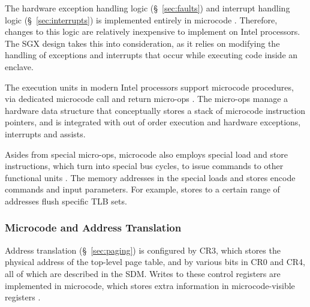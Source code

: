 The hardware exception handling logic (\S~\ref{sec:faults}) and interrupt
handling logic (\S~\ref{sec:interrupts}) is implemented entirely in microcode
\cite{intel1999exceptions}. Therefore, changes to this logic are relatively
inexpensive to implement on Intel processors. The SGX design takes this into
consideration, as it relies on modifying the handling of exceptions and
interrupts that occur while executing code inside an enclave.


The execution units in modern Intel processors support microcode procedures,
via dedicated microcode call and return micro-ops \cite{intel2007microstack}.
The micro-ops manage a hardware data structure that conceptually stores a stack
of microcode instruction pointers, and is integrated with out of order
execution and hardware exceptions, interrupts and assists.


Asides from special micro-ops, microcode also employs special load and store
instructions, which turn into special bus cycles, to issue commands to other
functional units \cite{intel1997microspace}. The memory addresses in the
special loads and stores encode commands and input parameters. For example,
stores to a certain range of addresses flush specific TLB sets.


\subsubsection{Microcode and Address Translation}
\label{sec:microcode_pmh}


Address translation (\S~\ref{sec:paging}) is configured by CR3, which stores
the physical address of the top-level page table, and by various bits in CR0
and CR4, all of which are described in the SDM. Writes to these control
registers are implemented in microcode, which stores extra information in
microcode-visible registers \cite{intel2009pipeline}.


